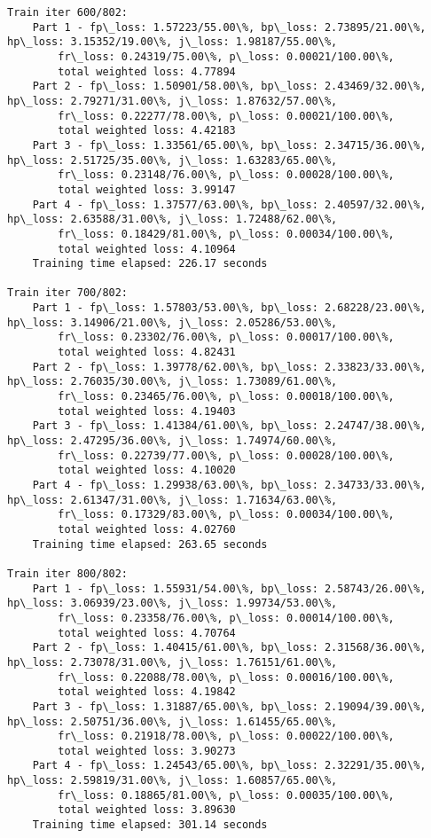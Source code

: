 \documentclass[11pt]{article}
\begin{document}
\begin{Verbatim}[commandchars=\\\{\}]
Train iter 600/802:
	Part 1 - fp\_loss: 1.57223/55.00\%, bp\_loss: 2.73895/21.00\%, hp\_loss: 3.15352/19.00\%, j\_loss: 1.98187/55.00\%, 
		fr\_loss: 0.24319/75.00\%, p\_loss: 0.00021/100.00\%, 
		total weighted loss: 4.77894
	Part 2 - fp\_loss: 1.50901/58.00\%, bp\_loss: 2.43469/32.00\%, hp\_loss: 2.79271/31.00\%, j\_loss: 1.87632/57.00\%, 
		fr\_loss: 0.22277/78.00\%, p\_loss: 0.00021/100.00\%, 
		total weighted loss: 4.42183
	Part 3 - fp\_loss: 1.33561/65.00\%, bp\_loss: 2.34715/36.00\%, hp\_loss: 2.51725/35.00\%, j\_loss: 1.63283/65.00\%, 
		fr\_loss: 0.23148/76.00\%, p\_loss: 0.00028/100.00\%, 
		total weighted loss: 3.99147
	Part 4 - fp\_loss: 1.37577/63.00\%, bp\_loss: 2.40597/32.00\%, hp\_loss: 2.63588/31.00\%, j\_loss: 1.72488/62.00\%, 
		fr\_loss: 0.18429/81.00\%, p\_loss: 0.00034/100.00\%, 
		total weighted loss: 4.10964
	Training time elapsed: 226.17 seconds

Train iter 700/802:
	Part 1 - fp\_loss: 1.57803/53.00\%, bp\_loss: 2.68228/23.00\%, hp\_loss: 3.14906/21.00\%, j\_loss: 2.05286/53.00\%, 
		fr\_loss: 0.23302/76.00\%, p\_loss: 0.00017/100.00\%, 
		total weighted loss: 4.82431
	Part 2 - fp\_loss: 1.39778/62.00\%, bp\_loss: 2.33823/33.00\%, hp\_loss: 2.76035/30.00\%, j\_loss: 1.73089/61.00\%, 
		fr\_loss: 0.23465/76.00\%, p\_loss: 0.00018/100.00\%, 
		total weighted loss: 4.19403
	Part 3 - fp\_loss: 1.41384/61.00\%, bp\_loss: 2.24747/38.00\%, hp\_loss: 2.47295/36.00\%, j\_loss: 1.74974/60.00\%, 
		fr\_loss: 0.22739/77.00\%, p\_loss: 0.00028/100.00\%, 
		total weighted loss: 4.10020
	Part 4 - fp\_loss: 1.29938/63.00\%, bp\_loss: 2.34733/33.00\%, hp\_loss: 2.61347/31.00\%, j\_loss: 1.71634/63.00\%, 
		fr\_loss: 0.17329/83.00\%, p\_loss: 0.00034/100.00\%, 
		total weighted loss: 4.02760
	Training time elapsed: 263.65 seconds

Train iter 800/802:
	Part 1 - fp\_loss: 1.55931/54.00\%, bp\_loss: 2.58743/26.00\%, hp\_loss: 3.06939/23.00\%, j\_loss: 1.99734/53.00\%, 
		fr\_loss: 0.23358/76.00\%, p\_loss: 0.00014/100.00\%, 
		total weighted loss: 4.70764
	Part 2 - fp\_loss: 1.40415/61.00\%, bp\_loss: 2.31568/36.00\%, hp\_loss: 2.73078/31.00\%, j\_loss: 1.76151/61.00\%, 
		fr\_loss: 0.22088/78.00\%, p\_loss: 0.00016/100.00\%, 
		total weighted loss: 4.19842
	Part 3 - fp\_loss: 1.31887/65.00\%, bp\_loss: 2.19094/39.00\%, hp\_loss: 2.50751/36.00\%, j\_loss: 1.61455/65.00\%, 
		fr\_loss: 0.21918/78.00\%, p\_loss: 0.00022/100.00\%, 
		total weighted loss: 3.90273
	Part 4 - fp\_loss: 1.24543/65.00\%, bp\_loss: 2.32291/35.00\%, hp\_loss: 2.59819/31.00\%, j\_loss: 1.60857/65.00\%, 
		fr\_loss: 0.18865/81.00\%, p\_loss: 0.00035/100.00\%, 
		total weighted loss: 3.89630
	Training time elapsed: 301.14 seconds


\end{Verbatim}
\end{document}
